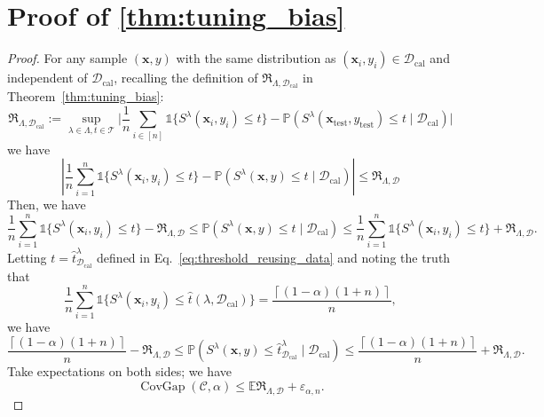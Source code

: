 \documentclass{article}
\renewcommand{\P}{\mathbb{P}}
\newcommand{\E}{\mathbb{E}}
\newcommand{\C}{\mathcal{C}}
\newcommand{\1}{\mathbbm{1}}
\newcommand{\Eqref}[1]{Eq.~\eqref{#1}}
\newcommand{\id}[1]{\mathds{1}\{#1\}}
\newcommand{\CovGap}{\mathop{\text{CovGap}}}
\newcommand{\of}[1]{\left(#1\right)}
\theoremstyle{plain}
\theoremstyle{definition}
\theoremstyle{remark}
\begin{document}
\section{Proof of \cref{thm:tuning_bias}}
\label{sec:proof_tuning_bias}
\begin{proof}
    For any sample $(\boldsymbol{x},y)$ with the same distribution as $(\boldsymbol{x}_i, y_i) \in \mathcal{D}_{\text{cal}}$ and independent of $\mathcal{D}_{\text{cal}}$, recalling the definition of \(\mathfrak{R}_{\Lambda, \mathcal{D}_{\text{cal}}}\) in Theorem~\ref{thm:tuning_bias}:
    \begin{equation*}
            \mathfrak{R}_{\Lambda, \mathcal{D}_{\text{cal}}} := \sup_{\lambda \in \Lambda, t \in \mathcal{T}} \Big| \frac{1}{n} \sum_{i \in [n]} \id{S^{\lambda}(\boldsymbol{x}_i, y_i) \leq t} 
            - \P\of{S^{\lambda}(\boldsymbol{x}_{\text{test}}, y_{\text{test}})\leq t \mid \mathcal{D}_{\text{cal}}}
            \Big|
    \end{equation*}
    we have
    \begin{equation*}
        |\frac{1}{n} \sum_{i=1}^n \id{S^{\lambda}(\boldsymbol{x}_i, y_i) \leq t} - \P(S^{\lambda}(\boldsymbol{x},y) \leq t \mid \mathcal{D}_{\text{cal}}) |
         \leq \mathfrak{R}_{\Lambda, \mathcal{D}} 
    \end{equation*}
    Then, we have
    \begin{equation*}
        \frac{1}{n} \sum_{i=1}^n \id{S^{\lambda}(\boldsymbol{x}_i, y_i) \leq t} - \mathfrak{R}_{\Lambda, \mathcal{D}} 
        \leq \P(S^{\lambda}(\boldsymbol{x},y) \leq t \mid \mathcal{D}_{\text{cal}}) \leq \frac{1}{n} \sum_{i=1}^n \id{S^{\lambda}(\boldsymbol{x}_i, y_i) \leq t} + \mathfrak{R}_{\Lambda, \mathcal{D}}.
    \end{equation*}
    Letting \(t = \hat{t}^\lambda_{\mathcal{D}_{\text{cal}}}\) defined in \Eqref{eq:threshold_reusing_data} and noting the truth that 
    \begin{equation*}
        \frac{1}{n} \sum_{i=1}^n \id{S^{\lambda}(\boldsymbol{x}_i, y_i) \leq \hat{t}(\lambda, \mathcal{D}_{\text{cal}})} = \frac{\left\lceil (1-\alpha)(1+n) \right\rceil}{n},
    \end{equation*}
    we have
    \begin{equation*}
        \frac{\left\lceil (1-\alpha)(1+n) \right\rceil}{n} - \mathfrak{R}_{\Lambda, \mathcal{D}} 
        \leq \P(S^{\lambda}(\boldsymbol{x},y) \leq \hat{t}^\lambda_{\mathcal{D}_{\text{cal}}} \mid \mathcal{D}_{\text{cal}}) \leq \frac{\left\lceil (1-\alpha)(1+n) \right\rceil}{n} + \mathfrak{R}_{\Lambda, \mathcal{D}}.
    \end{equation*}
    Take expectations on both sides; we have
    \begin{equation*}
        \CovGap({\C}, \alpha) \leq \E \mathfrak{R}_{\Lambda, \mathcal{D}} + \varepsilon_{\alpha, n}.
    \end{equation*}
\end{proof}
\end{document}
